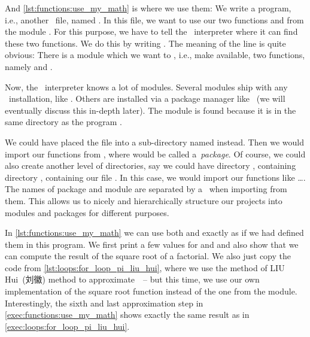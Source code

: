 %
%
%
\begin{sloppypar}%
And \cref{lst:functions:use_my_math} is where we use them:
We write a program, i.e., another \python\ file, named .
In this file, we want to use our two functions  and  from the module .
For this purpose, we have to tell the \python\ interpreter where it can find these two functions.
We do this by writing .
The meaning of the line is quite obvious:
There is a module   which we want to , i.e., make available, two functions, namely  and .%
\end{sloppypar}%
%
Now, the \python\ interpreter knows a lot of modules.
Several modules ship with any \python\ installation, like .
Others are installed via a package manager like ~(we will eventually discuss this in-depth later).
The  module is found because it is in the same directory as the program .

We could have placed the  file into a sub-directory named  instead.
Then we would import our functions from , where  would be called a~\emph{package}.
Of course, we could also create another level of directories, say we could have directory , containing directory , containing our file .
In this case, we would import our functions like \dots.
The names of package and module are separated by a~ when importing from them.
This allows us to nicely and hierarchically structure our projects into modules and packages for different purposes.

In \cref{lst:functions:use_my_math} we can use both  and  exactly as if we had defined them in this program.
We first print a few values for  and  and also show that we can compute the result of the square root of a factorial.
We also just copy the code from \cref{lst:loops:for_loop_pi_liu_hui}, where we use the method of LIU Hui~(刘徽) method to approximate~\numberPi\ -- but this time, we use our own implementation of the square root function instead of the one from the  module.
Interestingly, the sixth and last approximation step in \cref{exec:functions:use_my_math} shows exactly the same result as in \cref{exec:loops:for_loop_pi_liu_hui}.

